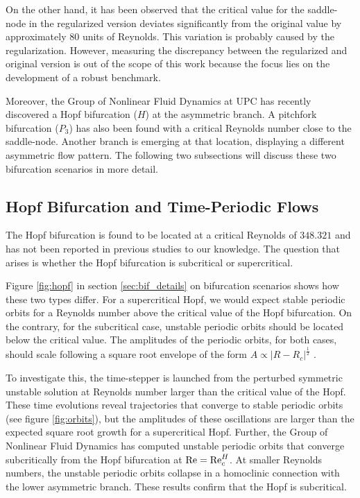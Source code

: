 On the other hand, it has been observed that the critical value for the
saddle-node in the regularized version deviates significantly from the original
value by approximately $80$ units of Reynolds. This variation is probably
caused by the regularization. However, measuring the discrepancy between the
regularized and original version is out of the scope of this work because the
focus lies on the development of a robust benchmark.

Moreover, the Group of Nonlinear Fluid Dynamics at UPC has recently discovered
a Hopf bifurcation ($H$) at the asymmetric branch. A pitchfork bifurcation
($P_3$) has also been found with a critical Reynolds number close to the
saddle-node. Another branch is emerging at that location, displaying a
different asymmetric flow pattern. The following two subsections will discuss
these two bifurcation scenarios in more detail.

\subsection{Hopf Bifurcation and Time-Periodic Flows}

The Hopf bifurcation is found to be located at a critical Reynolds of $348.321$
and has not been reported in previous studies to our knowledge. The question
that arises is whether the Hopf bifurcation is subcritical or
supercritical. 

Figure \ref{fig:hopf} in section \ref{sec:bif_details} on bifurcation scenarios
shows how these two types differ. For a supercritical Hopf, we would expect
stable periodic orbits for a Reynolds number above the critical value of the
Hopf bifurcation. On the contrary, for the subcritical case, unstable periodic
orbits should be located below the critical value. The amplitudes of the
periodic orbits, for both cases, should scale following a square root envelope
of the form $A \propto \lvert R - R_c \rvert^{\frac{1}{2}}$
\citep{kuznetsov2004}. 

To investigate this, the time-stepper is launched from the perturbed symmetric
unstable solution at Reynolds number larger than the critical value of the
Hopf. These time evolutions reveal trajectories that converge to stable
periodic orbits (see figure \ref{fig:orbits}), but the amplitudes of these
oscillations are larger than the expected square root growth for a
supercritical Hopf. Further, the Group of Nonlinear Fluid Dynamics has computed
unstable periodic orbits that converge subcritically from the Hopf bifurcation
at $\mathrm{Re} = \mathrm{Re}_c^H$. At smaller Reynolds numbers, the unstable periodic orbits
collapse in a homoclinic connection with the lower asymmetric branch. These
results confirm that the Hopf is subcritical.

